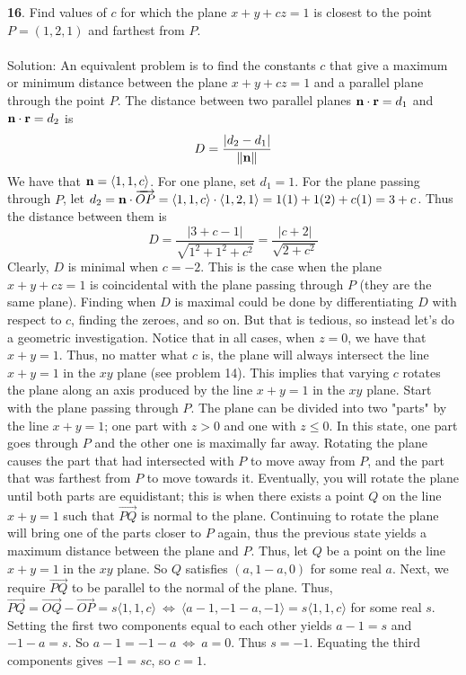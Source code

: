 \documentclass[12pt]{amsbook}
\newcommand{\la}{\langle}
\newcommand{\ra}{\rangle}
\begin{document}
\enlargethispage{15pt}
{\small\bf 16}. Find values of $c$ for which the plane
$x+y+cz=1$ is closest to the point $P=(1,2,1)$ and 
farthest from $P$.\\
\\
{\sc Solution}: An equivalent problem is to find the constants $c$ that give a maximum or minimum distance between the plane $x+y+cz=1$ and a parallel plane through the point $P$. The distance between two parallel planes ${\bf n}\cdot{\bf r}=d_1$ and ${\bf n}\cdot{\bf r}=d_2$ is
$$D=\frac{|d_2-d_1|}{\|{\bf n}\|}$$
We have that ${\bf n}=\la 1,1,c \ra$. For one plane, set $d_1=1$. For the plane passing through $P$, let $d_2={\bf n}\cdot\overrightarrow{OP}=\la 1,1,c \ra\cdot \la 1,2,1 \ra = 1(1)+1(2)+c(1)=3+c$. Thus the distance between them is
$$D=\frac{|3+c-1|}{\sqrt{1^2+1^2+c^2}}=\frac{|c+2|}{\sqrt{2+c^2}}$$
Clearly, $D$ is minimal when $c=-2$. This is the case when the plane $x+y+cz=1$ is coincidental with the plane passing through $P$ (they are the same plane). Finding when $D$ is maximal could be done by differentiating $D$ with respect to $c$, finding the zeroes, and so on. But that is tedious, so instead let's do a geometric investigation. Notice that in all cases, when $z=0$, we have that $x+y=1$. Thus, no matter what $c$ is, the plane will always intersect the line $x+y=1$ in the $xy$ plane (see problem 14). This implies that varying $c$ rotates the plane along an axis produced by the line $x+y=1$ in the $xy$ plane. Start with the plane passing through $P$. The plane can be divided into two "parts" by the line $x+y=1$; one part with $z>0$ and one with $z \leq 0$. In this state, one part goes through $P$ and the other one is maximally far away. Rotating the plane causes the part that had intersected with $P$ to move away from $P$, and the part that was farthest from $P$ to move towards it. Eventually, you will rotate the plane until both parts are equidistant; this is when there exists a point $Q$ on the line $x+y=1$ such that $\overrightarrow{PQ}$ is normal to the plane. Continuing to rotate the plane will bring one of the parts closer to $P$ again, thus the previous state yields a maximum distance between the plane and $P$. Thus, let $Q$ be a point on the line $x+y=1$ in the $xy$ plane. So $Q$ satisfies $(a, 1-a, 0)$ for some real $a$. Next, we require $\overrightarrow{PQ}$ to be parallel to the normal of the plane. Thus, $\overrightarrow{PQ}=\overrightarrow{OQ}-\overrightarrow{OP}=s\la 1,1,c \ra \ \Leftrightarrow \ \la a-1,-1-a,-1 \ra =s\la 1,1,c\ra$ for some real $s$. Setting the first two components equal to each other yields $a-1=s$ and $-1-a=s$. So $a-1=-1-a \ \Leftrightarrow \ a=0$. Thus $s=-1$. Equating the third components gives $-1=sc$, so $c=1$. 
\end{document}
